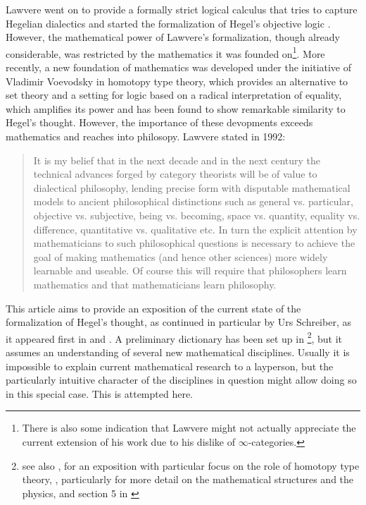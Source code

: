 \documentclass{article}
\begin{document}
Lawvere went on to provide a formally strict logical calculus that tries to capture Hegelian dialectics
and started the formalization of Hegel's objective logic \cite{Law91}. However, the mathematical power
of Lawvere's formalization, though already considerable, was restricted by the mathematics it was founded
on\footnote{There is also some indication that Lawvere might not actually appreciate the current extension
of his work due to his dislike of $\infty$-categories.}. More recently, a new foundation of mathematics
was developed under the initiative of Vladimir Voevodsky in homotopy type theory, which provides an alternative
to set theory and a setting for logic based on a radical interpretation of equality, which amplifies its
power and has been found to show remarkable similarity to Hegel's thought. However, the importance of
these devopments exceeds mathematics and reaches into philosopy. Lawvere stated in 1992\cite{Lawvere92}:


\begin{quote}
It is my belief that in the next decade and in the next century the technical advances forged by category
theorists will be of value to dialectical philosophy, lending precise form with disputable mathematical
models to ancient philosophical distinctions such as general vs. particular, objective vs. subjective,
being vs. becoming, space vs. quantity, equality vs. difference, quantitative vs. qualitative etc. In
turn the explicit attention by mathematicians to such philosophical questions is necessary to achieve
the goal of making mathematics (and hence other sciences) more widely learnable and useable. Of course
this will require that philosophers learn mathematics and that mathematicians learn philosophy.    
\end{quote}

This article aims to provide an exposition of the current state of the formalization of Hegel's thought,
as continued in particular by Urs Schreiber, as it appeared first in \cite{SQuant} and \cite{SSOrb}. A
preliminary dictionary has been set up in \cite{nlabsol} \footnote{see also \cite{Stalk}, \cite{SSh} for
an exposition with particular focus on the role of homotopy type theory, \cite{dcct}, particularly for
more detail on the mathematical structures and the physics, and section 5 in \cite{Cor}}, but it assumes
an understanding of several new mathematical disciplines. Usually it is impossible to explain current
mathematical research to a layperson, but the particularly intuitive character of the disciplines in question
might allow doing so in this special case. This is attempted here.
\end{document}
